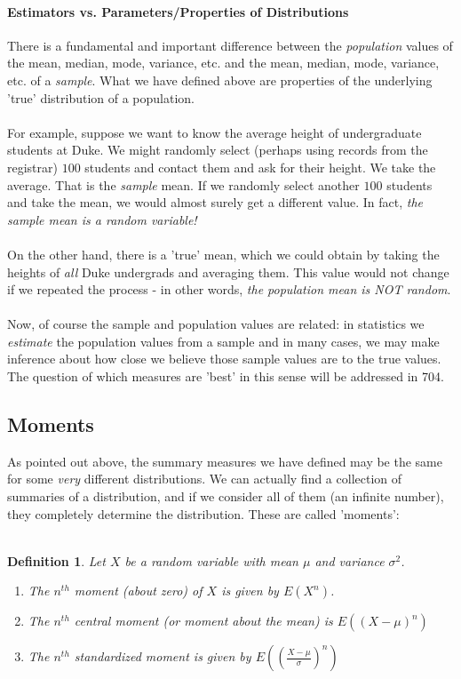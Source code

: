 \documentclass[12pt]{article} %
\newtheorem{defn}{Definition}
\begin{document}
\paragraph{Estimators vs. Parameters/Properties of Distributions}
There is a fundamental and important difference between the \emph{population} values of the mean, median, mode, variance, etc. and the mean, median, mode, variance, etc. of a \emph{sample}. What we have defined above are properties of the underlying 'true' distribution of a population. \\\\
For example, suppose we want to know the average height of undergraduate students at Duke. We might randomly select (perhaps using records from the registrar) $100$ students and contact them and ask for their height. We take the average. That is the \emph{sample} mean. If we randomly select another $100$ students and take the mean, we would almost surely get a different value. In fact, \emph{the sample mean is a random variable!} \\\\
On the other hand, there is a 'true' mean, which we could obtain by taking the heights of \emph{all} Duke undergrads and averaging them. This value would not change if we repeated the process - in other words, \emph{the population mean is NOT random}.\\\\
Now, of course the sample and population values are related: in statistics we \emph{estimate} the population values from a sample and in many cases, we may make inference about how close we believe those sample values are to the true values. The question of which measures are 'best' in this sense will be addressed in 704.
\subsection{Moments}
As pointed out above, the summary measures we have defined may be the same for some \emph{very} different distributions. We can actually find a collection of summaries of a distribution, and if we consider all of them (an infinite number), they completely determine the distribution. These are called 'moments':\\\\
\begin{defn}
Let $X$ be a random variable with mean $\mu$ and variance $\sigma^2$. 
\begin{enumerate}
\item The $n^{th}$ moment (about zero) of $X$ is given by $E(X^n)$.
\item The $n^{th}$ central moment (or moment about the mean) is $E((X-\mu)^n)$
\item The $n^{th}$ standardized moment is given by $E\left(\left(\frac{X-\mu}{\sigma}\right)^n\right)$
\end{enumerate}
\end{defn} 
\end{document}
